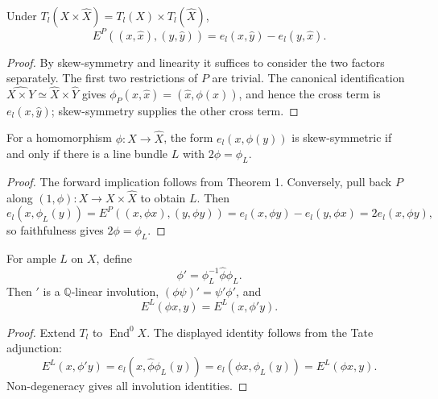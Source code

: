 \begin{proposition}
\label{mumford-prop-poincare-riemann-form}
Under $T_l(X\times\widehat X)=T_l(X)\times T_l(\widehat X)$,
\[
E^P((x,\widehat x),(y,\widehat y))
=e_l(x,\widehat y)-e_l(y,\widehat x).
\]
\end{proposition}
\begin{proof}
By skew-symmetry and linearity it suffices to consider the two factors
separately. The first two restrictions of $P$ are trivial. The canonical
identification $\widehat{X\times Y}\simeq\widehat X\times\widehat Y$ gives
$\phi_P(x,\widehat x)=(\widehat x,\phi(x))$, and hence the cross term is
$e_l(x,\widehat y)$; skew-symmetry supplies the other cross term.
\end{proof}

\begin{theorem}
\label{mumford-thm-riemann-form-line-bundle}
For a homomorphism $\phi:X\to\widehat X$, the form
$e_l(x,\phi(y))$ is skew-symmetric if and only if there is a line bundle
$L$ with $2\phi=\phi_L$.
\end{theorem}
\begin{proof}
The forward implication follows from Theorem 1. Conversely, pull back $P$
along $(1,\phi):X\to X\times\widehat X$ to obtain $L$. Then
\[
e_l(x,\phi_L(y))=E^P((x,\phi x),(y,\phi y))
=e_l(x,\phi y)-e_l(y,\phi x)=2e_l(x,\phi y),
\]
so faithfulness gives $2\phi=\phi_L$.
\end{proof}

\begin{proposition}
\label{mumford-prop-rosati-involution}
For ample $L$ on $X$, define
\[
\phi'=\phi_L^{-1}\widehat\phi\phi_L.
\]
Then $'$ is a $\mathbb Q$-linear involution,
$(\phi\psi)'=\psi'\phi'$, and
\[
E^L(\phi x,y)=E^L(x,\phi'y).
\]
\end{proposition}
\begin{proof}
Extend $T_l$ to $\operatorname{End}^0X$. The displayed identity follows
from the Tate adjunction:
\[
E^L(x,\phi'y)=e_l(x,\widehat\phi\phi_L(y))
=e_l(\phi x,\phi_L(y))=E^L(\phi x,y).
\]
Non-degeneracy gives all involution identities.
\end{proof}

